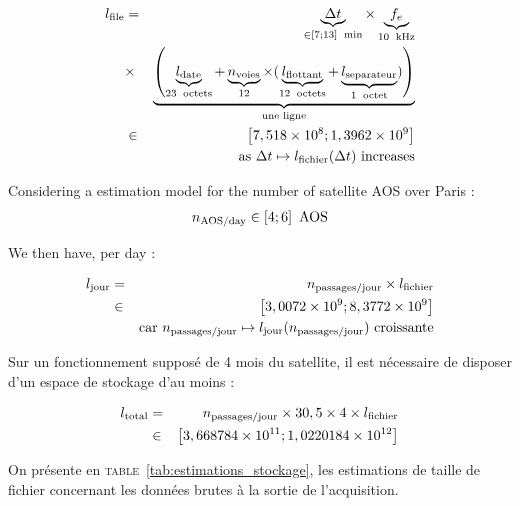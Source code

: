 \documentclass[a4paper]{report}
\begin{document}
  \begin{eqnarray}
    l_{\textup{file}} &=& \underbrace{\Delta t}_{\in \left [ 7 ; 13 \right ] \ \operatorname{min}} \times \underbrace{f_e}_{10 \ \operatorname{kHz}} \nonumber\\
                    &\times& \underbrace{\left (\underbrace{l_{\textup{date}}}_{23 \ \operatorname{octets}} + \underbrace{n_{\textup{voies}}}_{12} \times (\underbrace{l_{\textup{flottant}}}_{12 \ \operatorname{octets}} + \underbrace{l_{\textup{separateur}}}_{1 \ \operatorname{octet}} ) \right )}_{\textup{une ligne}}\\
                    &\in& \left [ 7,518 \times 10^8 ; 1,3962 \times 10^9 \right ] \\
                    &\ &  \textup{as } \Delta t \mapsto l_{\textup{fichier}} (\Delta t) \ \textup{increases} \nonumber
  \end{eqnarray}

Considering a estimation model for the number of satellite AOS over Paris\cite{IPGP_simul_loic} :
\begin{eqnarray}
  n_{\textup{AOS/day}} \in \left [ 4 ; 6 \right ] \ \textup{AOS}
\end{eqnarray}

We then have, per day :

\begin{eqnarray}
  l_{\textup{jour}} &=& n_{\textup{passages/jour}} \times l_{\textup{fichier}}\\
                &\in& \left [ 3,0072 \times 10^9 ; 8,3772 \times 10^9 \right ] \\
                &\ & \textup{car } n_{\textup{passages/jour}} \mapsto l_{\textup{jour}} (n_{\textup{passages/jour}}) \ \textup{croissante} \nonumber
\end{eqnarray}

Sur un fonctionnement suppos\'e de 4 mois\cite{IITB_general} du satellite, il est n\'ecessaire de disposer d'un espace de stockage d'au moins :

\begin{eqnarray}
  l_{\textup{total}} &=& n_{\textup{passages/jour}} \times 30,5 \times 4 \times l_{\textup{fichier}}\\
                 &\in& \left [ 3,668784 \times 10^{11} ; 1,0220184 \times 10^{12} \right ]
\end{eqnarray}



On pr\'esente en \textsc{table}~\ref{tab:estimations_stockage}, les estimations de taille de fichier concernant les donn\'ees brutes à la sortie de l'acquisition.
\end{document}
